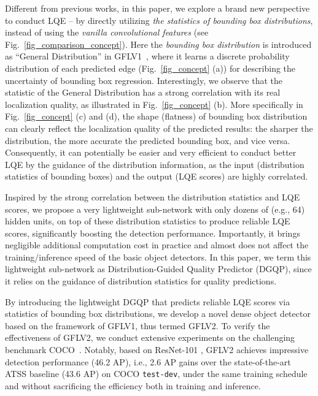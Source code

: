 \documentclass[10pt,twocolumn,letterpaper]{article}
\begin{document}
Different from previous works,
in this paper, 
we explore 
a brand new 
perspective to conduct LQE -- by 
directly utilizing \emph{the statistics of bounding box distributions}, instead of using the \emph{vanilla convolutional features} (see Fig.~\ref{fig_comparison_concept}).
Here the \emph{bounding box distribution} is introduced as ``General Distribution'' in GFLV1~\cite{li2020generalized}, where it learns a discrete probability distribution of each predicted edge (Fig.~\ref{fig_concept} (a)) for describing the uncertainty of bounding box regression.
Interestingly, 
we 
observe that 
the statistic
of the General Distribution has a strong correlation with its real localization quality, as illustrated in Fig.~\ref{fig_concept} (b). More specifically in Fig.~\ref{fig_concept} (c) and (d), the shape (flatness) of bounding box distribution can clearly reflect the 
localization quality of the predicted results:
the sharper the distribution, the more accurate the predicted bounding box, and vice versa. Consequently, it can potentially be easier and very efficient to conduct better LQE by the guidance of the distribution information, as the input (distribution statistics of bounding boxes) and the output (LQE scores) are highly correlated.










Inspired by the strong correlation between the distribution statistics and LQE scores, we propose a very lightweight sub-network with only dozens of (e.g., 64) hidden units, on top of 
these distribution statistics to produce reliable LQE scores, significantly boosting the detection performance. Importantly, it brings negligible additional computation cost in practice and almost does not affect the training/inference speed of the basic object detectors. In this paper, we term this lightweight sub-network as Distribution-Guided Quality Predictor (DGQP), since it relies on the guidance of distribution statistics for quality predictions. 

By introducing the lightweight DGQP that predicts reliable LQE scores via statistics of bounding box distributions, we develop a novel dense object detector based on the framework of GFLV1, thus termed GFLV2.
To verify the effectiveness of GFLV2, we conduct extensive experiments on the challenging benchmark COCO~\cite{lin2014microsoft}.
Notably, based on ResNet-101 \cite{he2016deep}, GFLV2 achieves impressive detection performance (46.2 AP), i.e., 2.6 AP gains over the state-of-the-art ATSS baseline (43.6 AP) on COCO {\tt test-dev}, under the same training schedule and without sacrificing the efficiency both in training and inference.
\end{document}
